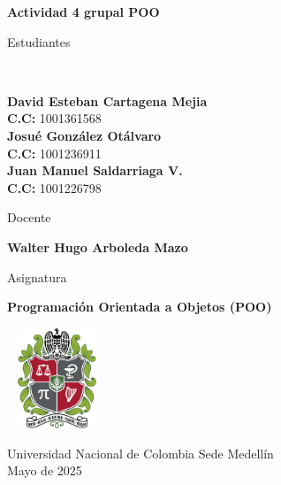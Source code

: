 \begin{titlepage}
	\Large{
	\begin{center}
		\vspace*{0.5cm}
 
		\textbf{Actividad 4 grupal POO}
 
			 
		\vspace{0.5cm}
		
		Estudiantes
		
		\vspace{0.5cm}
		 \

 
		\textbf{David Esteban Cartagena Mejia} \\
		  \textbf{C.C:} 1001361568 \\	

		\textbf{Josué González Otálvaro} \\
		  \textbf{C.C:} 1001236911 \\	  		 

		 \textbf{Juan Manuel Saldarriaga V.} \\
		  \textbf{C.C:} 1001226798 \\
		  
	 
 
	   \vspace{0.5cm}
		
		Docente 
		
		\vspace{0.5cm}
 
		\textbf{Walter Hugo Arboleda Mazo}
		\vspace{0.4cm}
		
		Asignatura
		
		\vspace{0.5cm}
 
		\textbf{Programación Orientada a Objetos (POO)}
 
		\vfill
 
		\includegraphics[width=3cm,height=3cm]{logo.png}\\[0.2cm]
	  
		\vspace{0.2cm}
	  
				 
		Universidad Nacional de Colombia Sede Medellín\\
		Mayo de 2025
		
	\end{center}
	}
 \end{titlepage}